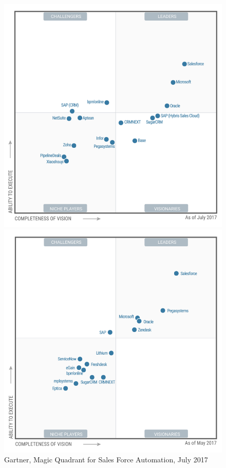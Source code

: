 \begin{figure}[!h]
    \begin{minipage}[c]{0.50\linewidth}
        \includegraphics[width=\linewidth]{images/magic_quadrant_sales_force_automation_2.png}
        \captionsetup{margin=0.2cm}
        \caption[Magic Quadrant for Sales Force Automation]{Gartner, Magic Quadrant for Sales Force Automation, July 2017}
        \label{fig:magic-quadrant-sales-force}
    \end{minipage}
    \hfill
    \begin{minipage}[c]{0.50\linewidth}
        \includegraphics[width=\linewidth]{images/magic_quadrant_customer_engagement_center_2.png}

\end{minipage}
\end{figure}
